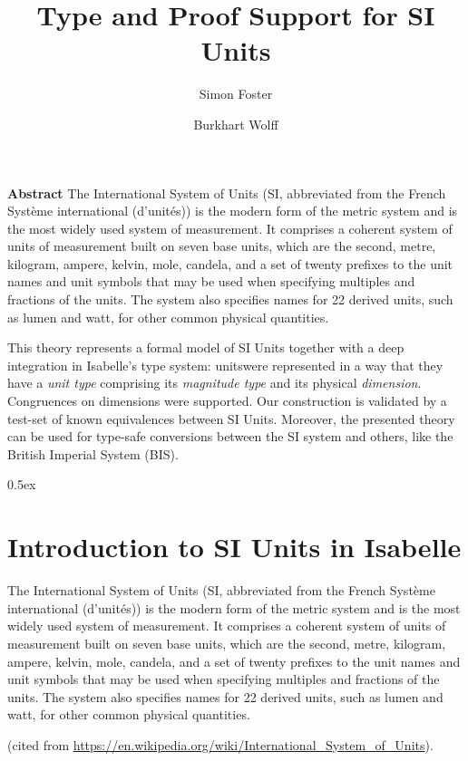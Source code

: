 \documentclass[11pt,a4paper]{book}
\begin{document}
\title{Type and Proof Support for SI Units}
\author{ Simon Foster \and Burkhart Wolff}
\maketitle

\textbf{ Abstract } 
The International System of Units 
(SI, abbreviated from the French Syst\`eme international (d’unit\'es)) is the modern form of 
the metric system and is the most widely used system of measurement. It comprises a coherent 
system of units of measurement built on seven base units, which are the second, metre, kilogram, 
ampere, kelvin, mole, candela, and a set of twenty prefixes to the unit names and unit symbols 
that may be used when specifying multiples and fractions of the units. The system also specifies 
names for 22 derived units, such as lumen and watt, for other common physical quantities. 

This theory represents a formal model of SI Units together with a deep integration in Isabelle's
type system: unitswere represented in a way that they have a \emph{unit type} comprising its 
\emph{magnitude type} and its physical \emph{dimension}. Congruences on dimensions were supported. 
Our construction is validated by a test-set of known equivalences between SI Units.
Moreover, the presented theory can be used for type-safe conversions between the SI system and
others, like the British Imperial System (BIS).

\tableofcontents

\parindent 0pt\parskip 0.5ex


\chapter{Introduction to SI Units in Isabelle}

The International System of Units (SI, abbreviated from the French
Système international (d'unités)) is the modern form of the metric
system and is the most widely used system of measurement. It comprises
a coherent system of units of measurement built on seven base units,
which are the second, metre, kilogram, ampere, kelvin, mole, candela,
and a set of twenty prefixes to the unit names and unit symbols that
may be used when specifying multiples and fractions of the units.
The system also specifies names for 22 derived units, such as lumen and
watt, for other common physical quantities.

(cited from \url{https://en.wikipedia.org/wiki/International_System_of_Units}).
\end{document}
